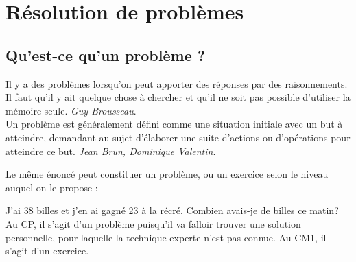 %
%


\newpage


\section{Résolution de problèmes} %

\subsection{Qu'est-ce qu'un problème ?} 


\og Il y a des problèmes lorsqu’on peut apporter des réponses par des raisonnements. Il faut qu’il y ait quelque chose à chercher et qu’il ne soit pas possible d’utiliser la mémoire seule. \fg{} {\it Guy Brousseau}. \\ [1mm]
\og Un problème est généralement défini comme une situation initiale avec un but à atteindre, demandant au sujet d’élaborer une suite d'actions ou d'opérations pour atteindre ce but. \fg{} {\it Jean Brun, Dominique Valentin}.

Le même énoncé peut constituer un problème, ou un exercice selon le niveau auquel on le propose :
\begin{exemple*1}
   {\small
   J’ai 38 billes et j’en ai gagné 23 à la récré. Combien avais-je de billes ce matin? \\
   Au CP, il s'agit d'un problème puisqu'il va falloir trouver une solution personnelle, pour laquelle la technique experte n'est pas connue. Au CM1, il s'agit d'un exercice.}
\end{exemple*1}

